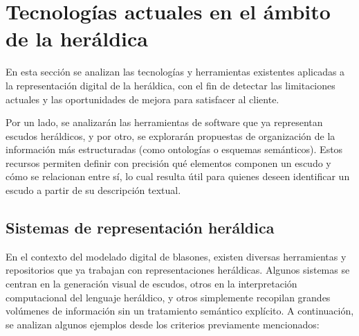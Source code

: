 \section{Tecnologías actuales en el ámbito de la heráldica}
En esta sección se analizan las tecnologías y herramientas existentes aplicadas a la representación
digital de la heráldica, con el fin de detectar las limitaciones actuales y las oportunidades
de mejora para satisfacer al cliente.

Por un lado, se analizarán las herramientas de software que ya representan escudos heráldicos,
y por otro, se explorarán propuestas de organización de la información más estructuradas
(como ontologías o esquemas semánticos). Estos recursos permiten definir con precisión
qué elementos componen un escudo y cómo se relacionan entre sí, lo cual resulta útil para
quienes deseen identificar un escudo a partir de su descripción textual.

\subsection{Sistemas de representación heráldica}
En el contexto del modelado digital de blasones, existen diversas herramientas y repositorios
que ya trabajan con representaciones heráldicas. Algunos sistemas se centran en la generación 
visual de escudos, otros en la interpretación computacional del lenguaje heráldico, y otros 
simplemente recopilan grandes volúmenes de información sin un tratamiento semántico explícito. 
A continuación, se analizan algunos ejemplos desde los criterios previamente mencionados:

